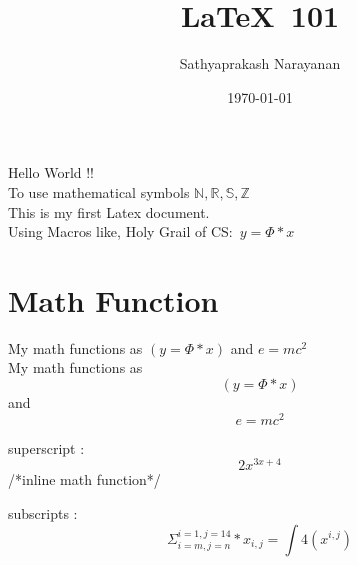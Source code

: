 \documentclass[11pt]{article}
\def\cs_eq{y=\Phi*x}
\def\exp{Holy Grail of CS:}
\begin{document}
\tableofcontents
\title{\LaTeX \ 101}
\author{Sathyaprakash Narayanan}
\date{\today}
\maketitle

Hello World !! \\
To use mathematical symbols $\mathbb{N,R,S,Z}$ \\
This is my first Latex document. \\
Using Macros like, \exp \ $\cs_eq$

\section{Math Function}
My math functions as $(y=\Phi*x)$ and $e=mc^2$ \\

My math functions as $$(y=\Phi*x)$$ and $$e=mc^2$$


superscript : $$2x^{3x+4}$$ /*inline math function*/

subscripts :  $$ \Sigma^{i=1,j=14}_{i=m,j=n}*x_{i,j} = \int 4(x^{i,j}) $$
\end{document}
